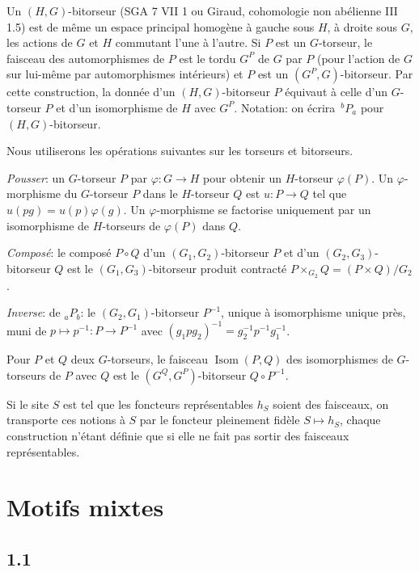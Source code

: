 \documentclass[12pt,a4paper]{article}
\theoremstyle{plain}
\theoremstyle{definition}
\theoremstyle{remark}
\DeclareMathOperator{\Isom}{Isom}
\begin{document}
Un $(H,G)$-bitorseur (SGA 7 VII 1 ou Giraud, cohomologie non ab\'elienne III 1.5) est
de m\^eme un espace principal homog\`ene \`a gauche sous $H$, \`a droite sous $G$, les actions
de $G$ et $H$ commutant l'une \`a l'autre. Si $P$ est un $G$-torseur, le faisceau des
automorphismes de $P$ est le tordu $G^P$ de $G$ par $P$ (pour l'action de $G$ sur lui-m\^eme
par automorphismes int\'erieurs) et $P$ est un $(G^P, G)$-bitorseur. Par cette construction,
la donn\'ee d'un $(H,G)$-bitorseur $P$ \'equivaut \`a celle d'un $G$-torseur $P$ et d'un
isomorphisme de $H$ avec $G^P$. Notation: on \'ecrira $\,^b\!P_a$ pour $(H,G)$-bitorseur.

Nous utiliserons les op\'erations suivantes sur les torseurs et bitorseurs.

\emph{Pousser}: un $G$-torseur $P$ par $\varphi: G \to H$ pour obtenir un $H$-torseur
$\varphi(P)$. Un $\varphi$-morphisme du $G$-torseur $P$ dans le $H$-torseur $Q$ est
$u: P \to Q$ tel que $u(pg) = u(p)\varphi(g)$. Un $\varphi$-morphisme se factorise
uniquement par un isomorphisme de $H$-torseurs de $\varphi(P)$ dans $Q$.

\emph{Compos\'e}: le compos\'e $P \circ Q$ d'un $(G_1, G_2)$-bitorseur $P$ et d'un
$(G_2, G_3)$-bitorseur $Q$ est le $(G_1, G_3)$-bitorseur produit contract\'e
$P \times_{G_2} Q = (P \times Q)/G_2$.

\emph{Inverse}: de $_a\!P_b$: le $(G_2, G_1)$-bitorseur $P^{-1}$, unique \`a isomorphisme
unique pr\`es, muni de $p \mapsto p^{-1}: P \to P^{-1}$ avec $(g_1 p g_2)^{-1} = g_2^{-1} p^{-1} g_1^{-1}$.

Pour $P$ et $Q$ deux $G$-torseurs, le faisceau $\Isom(P,Q)$ des isomorphismes de
$G$-torseurs de $P$ avec $Q$ est le $(G^Q, G^P)$-bitorseur $Q \circ P^{-1}$.

Si le site $S$ est tel que les foncteurs repr\'esentables $h_S$ soient des faisceaux,
on transporte ces notions \`a $S$ par le foncteur pleinement fid\`ele $S \mapsto h_S$,
chaque construction n'\'etant d\'efinie que si elle ne fait pas sortir des faisceaux
repr\'esentables.

\section{Motifs mixtes}\label{sec:1}

\subsection*{1.1}
\end{document}
